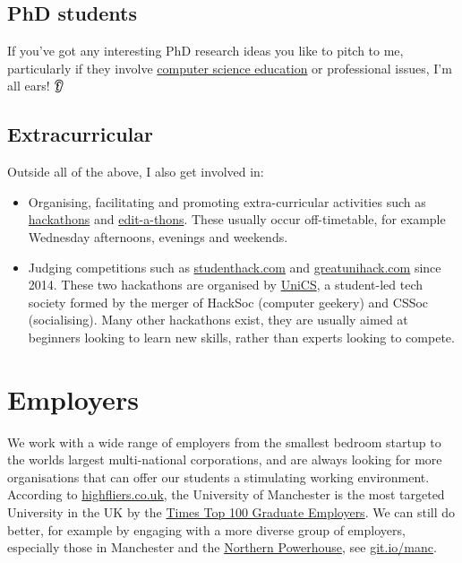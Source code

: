 \documentclass[
  12pt,
]{book}
\providecommand{\tightlist}{%
  \setlength{\itemsep}{0pt}\setlength{\parskip}{0pt}}
\begin{document}
\hypertarget{phds}{%
\section{PhD students}\label{phds}}

If you've got any interesting PhD research ideas you like to pitch to me, particularly if they involve \href{https://sigcse.cs.manchester.ac.uk}{computer science education} or professional issues, I'm all ears! 👂

\hypertarget{extracurricular}{%
\section{Extracurricular}\label{extracurricular}}

Outside all of the above, I also get involved in:

\begin{itemize}
\tightlist
\item
  Organising, facilitating and promoting extra-curricular activities such as \href{https://en.wikipedia.org/wiki/Hackathon}{hackathons} \citep{Briscoe, Warner2017} and \href{https://en.wikipedia.org/wiki/Edit-a-thon}{edit-a-thons}. \citep{goodbadugly, troubled, findingada2019} These usually occur off-timetable, for example Wednesday afternoons, evenings and weekends.
\item
  Judging competitions such as \href{https://www.studenthack.com}{studenthack.com} and \href{https://greatunihack.com}{greatunihack.com} since 2014. These two hackathons are organised by \href{https://www.unicsmcr.com/}{UniCS}, a student-led tech society formed by the merger of HackSoc (computer geekery) and CSSoc (socialising). Many other hackathons exist, they are usually aimed at beginners looking to learn new skills, rather than experts looking to compete. \citep{Briscoe, hafb}
\end{itemize}

\hypertarget{employers}{%
\chapter{Employers}\label{employers}}

We work with a wide range of employers from the smallest bedroom startup to the worlds largest multi-national corporations, and are always looking for more organisations that can offer our students a stimulating working environment. According to \href{https://www.highfliers.co.uk}{highfliers.co.uk}, the University of Manchester is the most targeted University in the UK by the \href{https://www.top100graduateemployers.com}{Times Top 100 Graduate Employers}. \citep{times100, highfliers2020, Birchall2019} We can still do better, for example by engaging with a more diverse group of employers, especially those in Manchester and the \href{https://northernpowerhouse.gov.uk/}{Northern Powerhouse}, see \href{https://git.io/manc}{git.io/manc}. \citep{gitmanc, londonvstherest, hebdenbridge, manhattanchester, manchattan}
\end{document}
